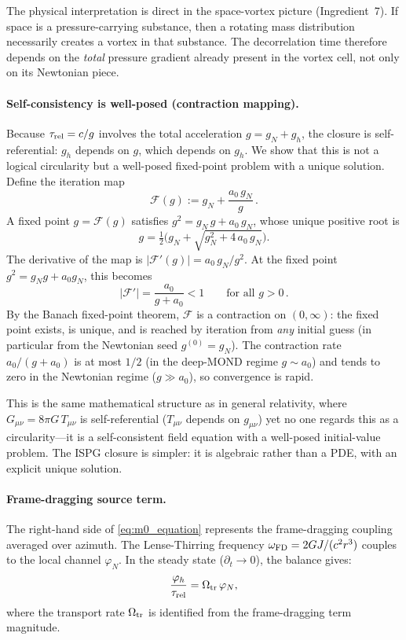 \documentclass[11pt]{article}
\begin{document}
The physical interpretation is direct in the space-vortex
picture (Ingredient~7).  If space is a pressure-carrying
substance, then a rotating mass distribution necessarily
creates a vortex in that substance.  The decorrelation time
therefore depends on the \emph{total} pressure gradient
already present in the vortex cell, not only on its
Newtonian piece.

\paragraph{Self-consistency is well-posed (contraction mapping).}
Because $\tau_{\rm rel}=c/g$ involves the total acceleration
$g=g_N+g_h$, the closure is self-referential: $g_h$ depends on $g$,
which depends on $g_h$.  We show that this is not a logical
circularity but a well-posed fixed-point problem with a unique
solution.  Define the iteration map
\begin{equation}\label{eq:contraction}
\mathcal{F}(g):= g_N + \frac{a_0\,g_N}{g}\,.
\end{equation}
A fixed point $g=\mathcal{F}(g)$ satisfies
$g^2 = g_N\,g + a_0\,g_N$, whose unique positive root is
\[
g = \tfrac{1}{2}\bigl(g_N+\sqrt{g_N^2+4\,a_0\,g_N}\bigr).
\]
The derivative of the map is
$|\mathcal{F}'(g)|=a_0\,g_N/g^2$.  At the fixed point
$g^2=g_N g+a_0 g_N$, this becomes
\begin{equation}\label{eq:contraction_rate}
|\mathcal{F}'|=\frac{a_0}{g+a_0}<1
\qquad\text{for all }g>0\,.
\end{equation}
By the Banach fixed-point theorem, $\mathcal{F}$ is a contraction
on $(0,\infty)$: the fixed point exists, is unique, and is reached
by iteration from \emph{any} initial guess (in particular from the
Newtonian seed $g^{(0)}=g_N$).  The contraction rate
$a_0/(g+a_0)$ is at most $1/2$ (in the deep-MOND regime
$g\sim a_0$) and tends to zero in the Newtonian regime
($g\gg a_0$), so convergence is rapid.

This is the same mathematical structure as in general relativity,
where $G_{\mu\nu}=8\pi G\,T_{\mu\nu}$ is self-referential
($T_{\mu\nu}$ depends on $g_{\mu\nu}$) yet no one regards this
as a circularity---it is a self-consistent field equation with a
well-posed initial-value problem.  The ISPG closure is simpler:
it is algebraic rather than a PDE, with an explicit unique
solution.

\paragraph{Frame-dragging source term.}
The right-hand side of \eqref{eq:m0_equation} represents the frame-dragging coupling averaged over azimuth. The Lense-Thirring frequency $\omega_{\rm FD} = 2GJ/(c^2r^3)$ couples to the local channel $\varphi_N$. In the steady state ($\partial_t \to 0$), the balance gives:
\begin{equation}
\frac{\varphi_h}{\tau_{\rm rel}} = \Omega_{\rm tr}\,\varphi_N,
\label{eq:transport_derived}
\end{equation}
where the transport rate $\Omega_{\rm tr}$ is identified from the frame-dragging term magnitude.
\end{document}
